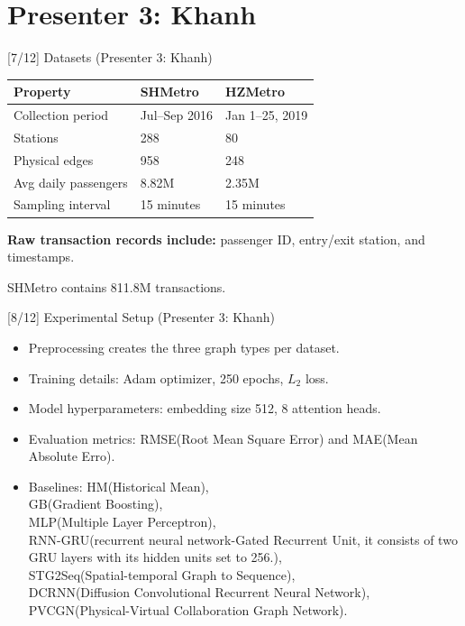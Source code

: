 \documentclass[aspectratio=169]{beamer}
\begin{document}
\section{Presenter 3: Khanh}


\begin{frame}{[7/12] Datasets (Presenter 3: Khanh)}
\hypertarget{sec:experiments}{}
  \begin{table}
    \centering
    \small
    \begin{tabular}{lll}
      \toprule
      Property & SHMetro & HZMetro \\
      \midrule
      Collection period & Jul--Sep 2016 & Jan 1--25, 2019 \\
      Stations & 288 & 80 \\
      Physical edges & 958 & 248 \\
      Avg daily passengers & 8.82M & 2.35M \\
      Sampling interval & 15 minutes & 15 minutes \\
      \bottomrule
    \end{tabular}
  \end{table}

  \vspace{0.25em}
  \small
  \textbf{Raw transaction records include:}
  passenger ID, entry/exit station, and timestamps.

  \vspace{0.2em}
  \small
  SHMetro contains 811.8M transactions.
\end{frame}

\begin{frame}{[8/12] Experimental Setup (Presenter 3: Khanh)}
  \begin{itemize}
    \item Preprocessing creates the three graph types per dataset.
    \item Training details: Adam optimizer, 250 epochs, \(L_2\) loss.
    \item Model hyperparameters: embedding size 512, 8 attention heads.
    \item Evaluation metrics: RMSE(Root Mean Square Error) and MAE(Mean Absolute Erro).
    \item Baselines: HM(Historical Mean), \\GB(Gradient Boosting), \\MLP(Multiple Layer Perceptron), \\RNN-GRU(recurrent neural network-Gated Recurrent Unit, it consists of two GRU layers with its hidden units set to 256.), \\STG2Seq(Spatial-temporal Graph to Sequence), \\DCRNN(Diffusion Convolutional Recurrent Neural Network), \\PVCGN(Physical-Virtual Collaboration Graph Network).
  \end{itemize}
\end{frame}
\end{document}
